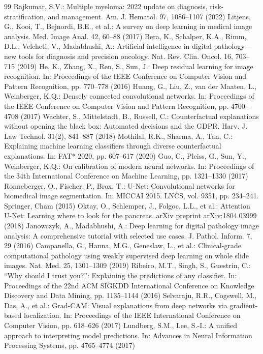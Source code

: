 \documentclass[runningheads]{llncs}
\begin{document}
\begin{thebibliography}{99}
 Rajkumar, S.V.: Multiple myeloma: 2022 update on diagnosis, risk-stratification, and management. Am. J. Hematol. 97, 1086--1107 (2022)
 Litjens, G., Kooi, T., Bejnordi, B.E., et al.: A survey on deep learning in medical image analysis. Med. Image Anal. 42, 60--88 (2017)
 Bera, K., Schalper, K.A., Rimm, D.L., Velcheti, V., Madabhushi, A.: Artificial intelligence in digital pathology---new tools for diagnosis and precision oncology. Nat. Rev. Clin. Oncol. 16, 703--715 (2019)
 He, K., Zhang, X., Ren, S., Sun, J.: Deep residual learning for image recognition. In: Proceedings of the IEEE Conference on Computer Vision and Pattern Recognition, pp. 770--778 (2016)
 Huang, G., Liu, Z., van der Maaten, L., Weinberger, K.Q.: Densely connected convolutional networks. In: Proceedings of the IEEE Conference on Computer Vision and Pattern Recognition, pp. 4700--4708 (2017)
 Wachter, S., Mittelstadt, B., Russell, C.: Counterfactual explanations without opening the black box: Automated decisions and the GDPR. Harv. J. Law Technol. 31(2), 841--887 (2018)
 Mothilal, R.K., Sharma, A., Tan, C.: Explaining machine learning classifiers through diverse counterfactual explanations. In: FAT* 2020, pp. 607--617 (2020)
 Guo, C., Pleiss, G., Sun, Y., Weinberger, K.Q.: On calibration of modern neural networks. In: Proceedings of the 34th International Conference on Machine Learning, pp. 1321--1330 (2017)
 Ronneberger, O., Fischer, P., Brox, T.: U-Net: Convolutional networks for biomedical image segmentation. In: MICCAI 2015. LNCS, vol. 9351, pp. 234--241. Springer, Cham (2015)
 Oktay, O., Schlemper, J., Folgoc, L.L., et al.: Attention U-Net: Learning where to look for the pancreas. arXiv preprint arXiv:1804.03999 (2018)
 Janowczyk, A., Madabhushi, A.: Deep learning for digital pathology image analysis: A comprehensive tutorial with selected use cases. J. Pathol. Inform. 7, 29 (2016)
 Campanella, G., Hanna, M.G., Geneslaw, L., et al.: Clinical-grade computational pathology using weakly supervised deep learning on whole slide images. Nat. Med. 25, 1301--1309 (2019)
 Ribeiro, M.T., Singh, S., Guestrin, C.: ``Why should I trust you?'': Explaining the predictions of any classifier. In: Proceedings of the 22nd ACM SIGKDD International Conference on Knowledge Discovery and Data Mining, pp. 1135--1144 (2016)
 Selvaraju, R.R., Cogswell, M., Das, A., et al.: Grad-CAM: Visual explanations from deep networks via gradient-based localization. In: Proceedings of the IEEE International Conference on Computer Vision, pp. 618--626 (2017)
 Lundberg, S.M., Lee, S.-I.: A unified approach to interpreting model predictions. In: Advances in Neural Information Processing Systems, pp. 4765--4774 (2017)
\end{thebibliography}
\end{document}

